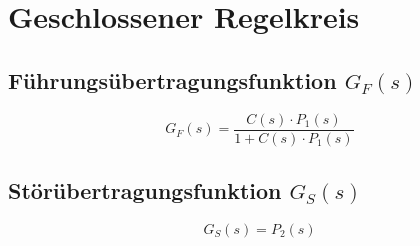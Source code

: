 \section{Geschlossener Regelkreis}

\subsection{Führungsübertragungsfunktion $G_F(s)$}
\[
	G_F(s) = \frac{C(s) \cdot P_1(s)}{1 + C(s) \cdot P_1(s)}
\]

\subsection{Störübertragungsfunktion $G_S(s)$}
\[
	G_S(s) = P_2(s)
\]
